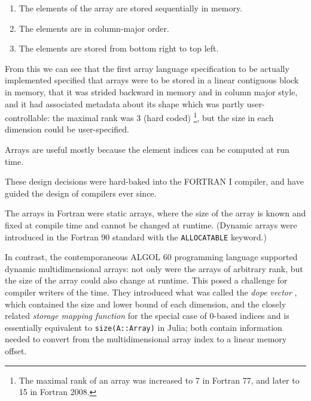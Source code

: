 \documentclass[preprint]{sigplanconf}
\newcommand{\ALGOL}{A\textsc{LGOL}}
\newcommand{\code}[1]{\texttt{#1}}
\begin{document}

\begin{enumerate}
\item The elements of the array are stored sequentially in memory.
\item The elements are in column-major order.
\item The elements are stored from bottom right to top left.
\end{enumerate}

From this we can see that the first array language specification to be actually implemented specified that arrays were to be stored in a linear contiguous block in memory, that it was strided backward in memory and in column major style, and it had associated metadata about its shape which was partly user-controllable: the maximal rank was 3 (hard coded) \footnote{The maximal rank of an array was increased to 7 in Fortran 77, and later to 15 in Fortran 2008.}, but the size in each dimension could be user-specified.

Arrays are useful mostly because the element indices can be computed at run time.



These design decisions were hard-baked into the FORTRAN I compiler, and have guided the design of compilers ever since.

The arrays in Fortran were static arrays, where the size of the array is known and fixed at compile time and cannot be changed at runtime. (Dynamic arrays were introduced in the Fortran 90 standard with the \code{ALLOCATABLE} keyword.)


In contrast, the contemporaneous \ALGOL{} 60 programming language supported dynamic multidimensional arrays: not only were the arrays of arbitrary rank, but the size of the array could also change at runtime. This posed a challenge for compiler writers of the time. They introduced what was called the \textit{dope vector} \cite{Sattley:1960as, Sattley:1961as}, which contained the size and lower bound of each dimension, and the closely related \textit{storage mapping function} \cite[pp.~80--87]{Randell:1964a6} for the special case of 0-based indices and is essentially equivalent to \code{size(A::Array)} in Julia; both contain information needed to convert from the multidimensional array index to a linear memory offset.

\end{document}
